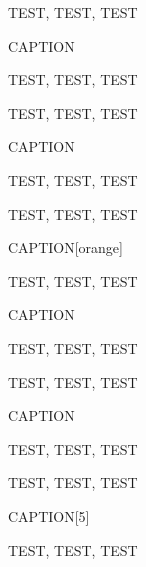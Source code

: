 \begin{ascolorbox15}{}

TEST, TEST, TEST

\end{ascolorbox15}

\begin{ascolorbox16}{CAPTION}

TEST, TEST, TEST

\end{ascolorbox16}

\begin{ascolorbox16}{}

TEST, TEST, TEST

\end{ascolorbox16}

\begin{ascolorbox17}{CAPTION}

TEST, TEST, TEST

\end{ascolorbox17}

\begin{ascolorbox17}{}

TEST, TEST, TEST

\end{ascolorbox17}

\begin{ascolorbox17}{CAPTION}[orange]

TEST, TEST, TEST

\end{ascolorbox17}

\begin{ascolorbox18}{CAPTION}

TEST, TEST, TEST

\end{ascolorbox18}

\begin{ascolorbox18}{}

TEST, TEST, TEST

\end{ascolorbox18}

\begin{ascolorbox19}{CAPTION}

TEST, TEST, TEST

\end{ascolorbox19}

\begin{ascolorbox19}{}

TEST, TEST, TEST

\end{ascolorbox19}

\begin{ascolorbox19}{CAPTION}[5]

TEST, TEST, TEST

\end{ascolorbox19}

